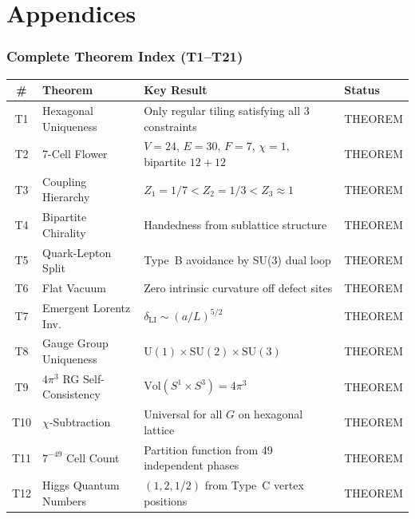 \documentclass[11pt,letterpaper]{article}
\begin{document}
%
%
\newpage
\appendix
\part*{Appendices}

\section{Complete Theorem Index (T1--T21)}

\begin{longtable}{clll}
\toprule
\textbf{\#} & \textbf{Theorem} & \textbf{Key Result} & \textbf{Status} \\
\midrule\endhead
T1  & Hexagonal Uniqueness         & Only regular tiling satisfying all 3 constraints & THEOREM \\
T2  & 7-Cell Flower                & $V=24$, $E=30$, $F=7$, $\chi=1$, bipartite $12+12$ & THEOREM \\
T3  & Coupling Hierarchy           & $Z_1=1/7 < Z_2=1/3 < Z_3\approx1$ & THEOREM \\
T4  & Bipartite Chirality          & Handedness from sublattice structure & THEOREM \\
T5  & Quark-Lepton Split           & Type~B avoidance by SU(3) dual loop & THEOREM \\
T6  & Flat Vacuum                  & Zero intrinsic curvature off defect sites & THEOREM \\
T7  & Emergent Lorentz Inv.        & $\delta_\mathrm{LI}\sim(a/L)^{5/2}$ & THEOREM \\
T8  & Gauge Group Uniqueness       & $\mathrm{U}(1)\times\mathrm{SU}(2)\times\mathrm{SU}(3)$ & THEOREM \\
T9  & $4\pi^3$ RG Self-Consistency & $\mathrm{Vol}(S^1\times S^3)=4\pi^3$ & THEOREM \\
T10 & $\chi$-Subtraction           & Universal for all $G$ on hexagonal lattice & THEOREM \\
T11 & $7^{-49}$ Cell Count         & Partition function from 49 independent phases & THEOREM \\
T12 & Higgs Quantum Numbers        & $(1,2,1/2)$ from Type~C vertex positions & THEOREM \\

\end{longtable}
\end{document}
